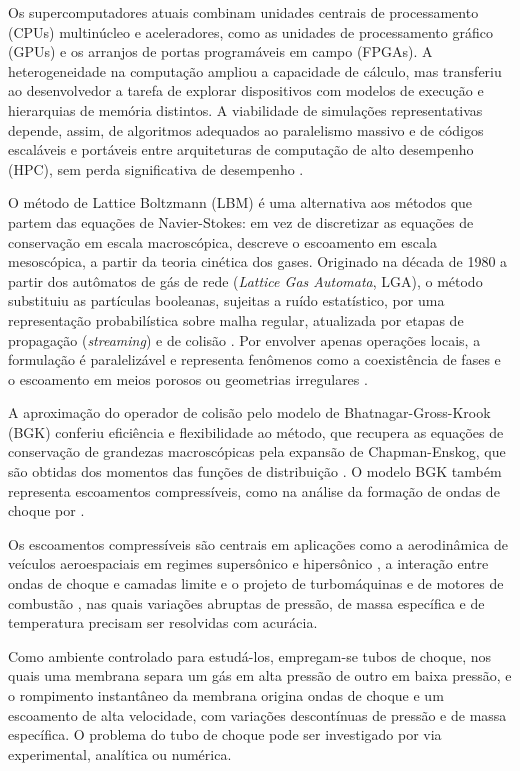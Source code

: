 Os supercomputadores atuais combinam unidades centrais de processamento (CPUs) multinúcleo e aceleradores, como as unidades de processamento gráfico (GPUs) e os arranjos de portas programáveis em campo (FPGAs).
A heterogeneidade na computação ampliou a capacidade de cálculo, mas transferiu ao desenvolvedor a tarefa de explorar dispositivos com modelos de execução e hierarquias de memória distintos.
A viabilidade de simulações representativas depende, assim, de algoritmos adequados ao paralelismo massivo e de códigos escaláveis e portáveis entre arquiteturas de computação de alto desempenho (HPC), sem perda significativa de desempenho \parencite{Davis2023, Karp2025}.

O método de Lattice Boltzmann (LBM) é uma alternativa aos métodos que partem das equações de Navier-Stokes: em vez de discretizar as equações de conservação em escala macroscópica, descreve o escoamento em escala mesoscópica, a partir da teoria cinética dos gases.
Originado na década de 1980 a partir dos autômatos de gás de rede (\textit{Lattice Gas Automata}, LGA), o método substituiu as partículas booleanas, sujeitas a ruído estatístico, por uma representação probabilística sobre malha regular, atualizada por etapas de propagação (\textit{streaming}) e de colisão \parencite{Kruger2017}.
Por envolver apenas operações locais, a formulação é paralelizável e representa fenômenos como a coexistência de fases e o escoamento em meios porosos ou geometrias irregulares \parencite{Chen1998}.

A aproximação do operador de colisão pelo modelo de Bhatnagar-Gross-Krook (BGK) \parencite{Bhatnagar1954} conferiu eficiência e flexibilidade ao método, que recupera as equações de conservação de grandezas macroscópicas pela expansão de Chapman-Enskog, que são obtidas dos momentos das funções de distribuição \parencite{Qian1992, Chen1998}.
O modelo BGK também representa escoamentos compressíveis, como na análise da formação de ondas de choque por \textcite{Chu1965}.

Os escoamentos compressíveis são centrais em aplicações como a aerodinâmica de veículos aeroespaciais em regimes supersônico e hipersônico \parencite{Guo2020}, a interação entre ondas de choque e camadas limite \parencite{Qiu2020} e o projeto de turbomáquinas e de motores de combustão \parencite{Mira2023}, nas quais variações abruptas de pressão, de massa específica e de temperatura precisam ser resolvidas com acurácia.

Como ambiente controlado para estudá-los, empregam-se tubos de choque, nos quais uma membrana separa um gás em alta pressão de outro em baixa pressão, e o rompimento instantâneo da membrana origina ondas de choque e um escoamento de alta velocidade, com variações descontínuas de pressão e de massa específica.
O problema do tubo de choque pode ser investigado por via experimental, analítica ou numérica.

